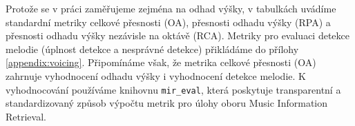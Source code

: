 Protože se v práci zaměřujeme zejména na odhad výšky, v tabulkách uvádíme standardní metriky celkové přesnosti (OA), přesnosti odhadu výšky (RPA) a přesnosti odhadu výšky nezávisle na oktávě (RCA). Metriky pro evaluaci detekce melodie (úplnost detekce a nesprávné detekce) přikládáme do přílohy \ref{appendix:voicing}. Připomínáme však, že metrika celkové přesnosti (OA) zahrnuje vyhodnocení odhadu výšky i vyhodnocení detekce melodie. K vyhodnocování používáme knihovnu \texttt{mir\_eval}, která poskytuje transparentní a standardizovaný způsob výpočtu metrik pro úlohy oboru Music Information Retrieval.

\begin{table}[p]
\centering
{}%
\caption{Výsledky celkové přesnosti (Overall Accuracy). Vyznačené výsledky jsou pro daný dataset nejvyšší z porovnávaných v rámci daného datasetu.}\label{tab:vysledky_OA}
\end{table}

